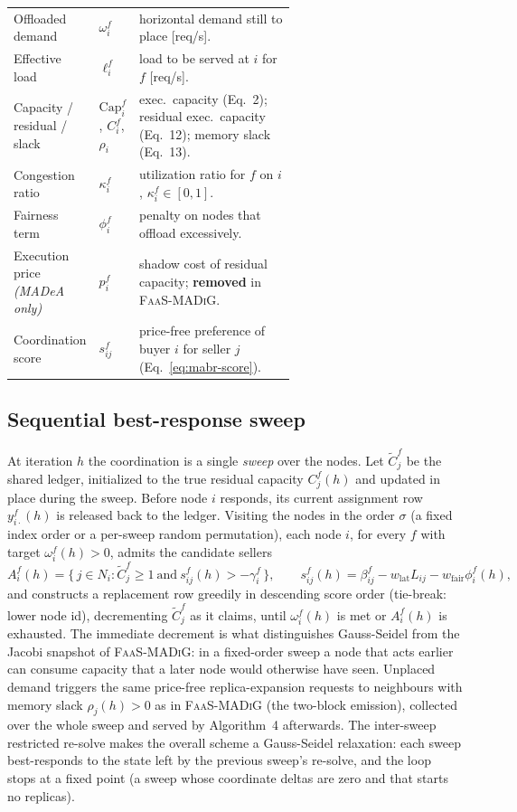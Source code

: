 \begin{table}[t]
\begin{tabular}{@{}l l p{0.62\linewidth}@{}}
Offloaded demand & $\omega_i^f$ & horizontal demand still to place [req/s].\\
Effective load & $\ell_i^f$ & load to be served at $i$ for $f$ [req/s].\\
Capacity / residual / slack & $\mathrm{Cap}_i^f$, $C_i^f$, $\rho_i$ & exec.\ capacity (Eq.~2); residual exec.\ capacity (Eq.~12); memory slack (Eq.~13).\\
Congestion ratio & $\kappa_i^f$ & utilization ratio for $f$ on $i$, $\kappa_i^f\in[0,1]$.\\
Fairness term & $\phi_i^f$ & penalty on nodes that offload excessively.\\
Execution price \emph{(MADeA only)} & $p_i^f$ & shadow cost of residual capacity; \textbf{removed} in \textsc{FaaS-MADiG}.\\
Coordination score & $s_{ij}^f$ & price-free preference of buyer $i$ for seller $j$ (Eq.~\eqref{eq:mabr-score}).\\
\bottomrule
\end{tabular}
\end{table}

\subsection{Sequential best-response sweep}
\label{sec:mabr-sweep}

At iteration $h$ the coordination is a single \emph{sweep} over the nodes. Let
$\tilde C_j^f$ be the shared ledger, initialized to the true residual capacity
$C_j^f(h)$ and updated in place during the sweep. Before node $i$ responds, its
current assignment row $y_{i\cdot}^f(h)$ is released back to the ledger. Visiting the nodes in the
order $\sigma$ (a fixed index order or a per-sweep random permutation), each node
$i$, for every $f$ with target $\omega_i^f(h)>0$, admits the candidate sellers
\begin{equation}
  A_i^f(h)=\{\,j\in N_i : \tilde C_j^f \ge 1 \ \text{and}\ s_{ij}^f(h)>-\gamma_i^f\,\},
  \qquad
  s_{ij}^f(h)=\beta_{ij}^f-w_{\mathrm{lat}}L_{ij}-w_{\mathrm{fair}}\phi_i^f(h),
  \label{eq:mabr-score}
\end{equation}
and constructs a replacement row greedily in descending score order (tie-break: lower
node id), decrementing $\tilde C_{j}^f$ as it claims, until $\omega_i^f(h)$ is met
or $A_i^f(h)$ is exhausted. The immediate decrement is what distinguishes
Gauss-Seidel from the Jacobi snapshot of \textsc{FaaS-MADiG}: in a fixed-order
sweep a node that acts earlier can consume capacity that a later node would
otherwise have seen. Unplaced demand triggers the same price-free
replica-expansion requests to neighbours with memory slack $\rho_j(h)>0$ as in
\textsc{FaaS-MADiG} (the two-block emission), collected over the whole sweep and
served by Algorithm~4 afterwards. The inter-sweep restricted re-solve makes the
overall scheme a Gauss-Seidel relaxation: each sweep best-responds to the state
left by the previous sweep's re-solve, and the loop stops at a fixed point (a
sweep whose coordinate deltas are zero and that starts no replicas).

